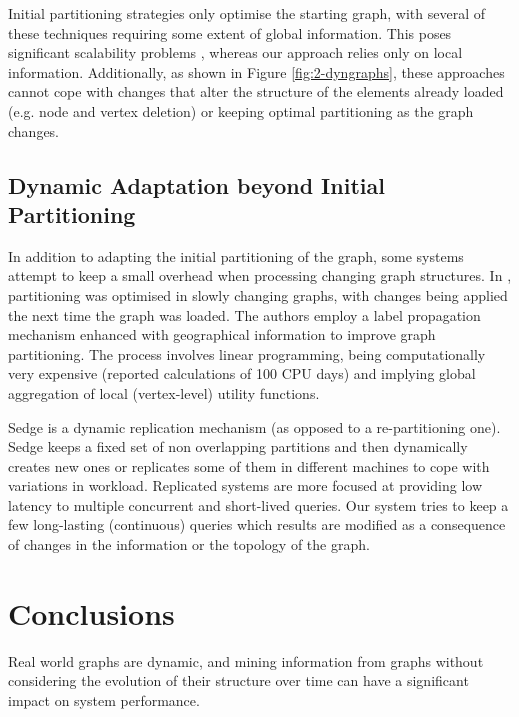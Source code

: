 \documentclass{sig-alternate-10pt}
\begin{document}
Initial partitioning strategies only optimise the starting graph, with several of these techniques requiring some extent of global information. This poses significant scalability problems \cite{Ugander}, whereas our approach relies only on local information. Additionally, as shown in Figure \ref{fig:2-dyngraphs}, these approaches cannot cope with changes that alter the structure of the elements already loaded (e.g. node and vertex deletion) or keeping optimal partitioning as the graph changes.  





\subsection{Dynamic Adaptation beyond Initial Partitioning}

In addition to adapting the initial partitioning of the graph, some systems attempt to keep a small overhead when processing changing graph structures. In  \cite{Ugander},  partitioning was optimised in slowly changing graphs, with changes being applied the next time the graph was loaded. The authors employ a label propagation mechanism enhanced with geographical information to improve graph partitioning. The process involves linear programming, being computationally very expensive (reported calculations of 100 CPU days) and implying global aggregation of local (vertex-level) utility functions.

Sedge \cite{Sedge} is a dynamic replication mechanism (as opposed to a re-partitioning one). Sedge keeps a fixed set of non overlapping partitions and then dynamically creates new ones or replicates some of them in different machines to cope with variations in workload. Replicated systems are more focused at providing low latency to multiple concurrent and short-lived queries. Our system tries to keep a few long-lasting (continuous) queries which results are modified as a consequence of changes in the information or the topology of the graph.



\section{Conclusions}
\label{sec:conclusions}

Real world graphs are dynamic, and mining information from graphs without considering the evolution of their structure over time can have a significant impact on system performance.
\end{document}
